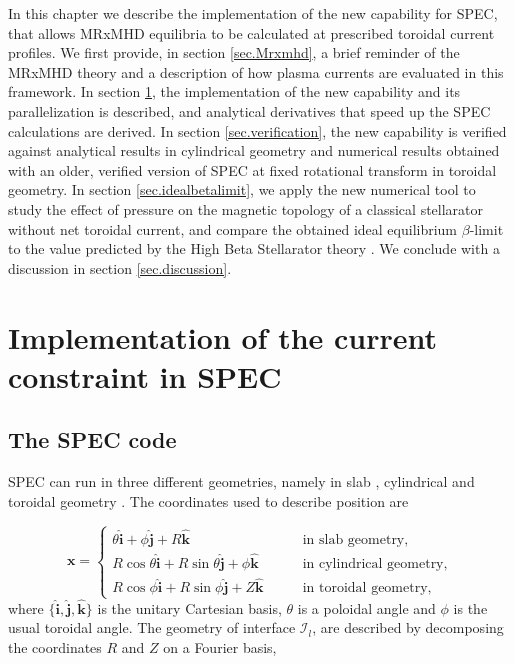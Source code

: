 In  this  chapter  we describe the implementation of the  new  capability  for  \ac{SPEC}, that allows \ac{MRxMHD} equilibria to be calculated at prescribed toroidal current profiles. We first provide, in section \ref{sec.Mrxmhd}, a brief reminder of the \ac{MRxMHD} theory and a description of how plasma currents are evaluated in this framework. In section \ref{sec.spec}, the implementation of the new capability and its parallelization is described, and analytical derivatives that speed up the \ac{SPEC} calculations are derived. In section \ref{sec.verification}, the new capability is verified against analytical results in cylindrical geometry and numerical results obtained with an older, verified \citep{Loizu2016} version of SPEC at fixed rotational transform in toroidal geometry. In section \ref{sec.idealbetalimit}, we apply the new numerical tool to study the effect of pressure on the magnetic topology of a classical stellarator without net toroidal current, and compare the obtained ideal equilibrium $\beta$-limit to the value predicted by the High Beta Stellarator theory \citep{Freidberg2014,wakatani_stellarator_1998}. We conclude with a discussion in section \ref{sec.discussion}.




\section{Implementation of the current constraint in \ac{SPEC}} \label{sec.spec}

\subsection{The SPEC code}
SPEC can run in three different geometries, namely in slab \citep{Loizu2019},  cylindrical \citep{Loizu2016a} and toroidal geometry \citep{Loizu2016}. The coordinates used to describe position are

\begin{equation}
    \mathbf{x} = \begin{cases}
    \theta\hat{\mathbf{i}} + \phi\hat{\mathbf{j}} + R\hat{\mathbf{k}} \qquad &\text{in slab geometry},\\
    R\cos\theta\hat{\mathbf{i}} + R\sin\theta\hat{\mathbf{j}} + \phi\hat{\mathbf{k}} \qquad &\text{in cylindrical geometry},\\
    R\cos\phi\hat{\mathbf{i}} + R\sin\phi\hat{\mathbf{j}} + Z\hat{\mathbf{k}} \qquad &\text{in toroidal geometry},
    \end{cases}
\end{equation}
where $\{\hat{\mathbf{i}},\hat{\mathbf{j}},\hat{\mathbf{k}}\}$ is the unitary Cartesian basis, $\theta$ is a poloidal angle and $\phi$ is the usual toroidal angle. The geometry of interface $\mathcal{I}_l$, are described by decomposing the coordinates $R$ and $Z$ on a Fourier basis,

